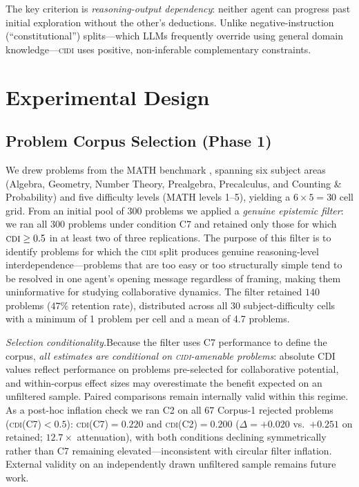 \documentclass{article}
\newcommand{\CDI}{\textsc{cdi}}
\newcommand{\CIDI}{\textsc{cidi}}
\begin{document}
The key criterion is \emph{reasoning-output dependency}: neither agent
can progress past initial exploration without the other's deductions.
Unlike negative-instruction (``constitutional'') splits---which LLMs
frequently override using general domain knowledge---\CIDI{} uses
positive, non-inferable complementary constraints.

\section{Experimental Design}
\label{sec:design}

\subsection{Problem Corpus Selection (Phase 1)}

We drew problems from the MATH benchmark \citep{hendrycks2021math},
spanning six subject areas (Algebra, Geometry, Number Theory,
Prealgebra, Precalculus, and Counting \& Probability) and five
difficulty levels (MATH levels 1--5), yielding a $6 \times 5 = 30$
cell grid. From an initial pool of 300 problems we applied a
\emph{genuine epistemic filter}: we ran all 300 problems under
condition C7 and retained only those for which $\CDI \geq 0.5$ in at
least two of three replications. The purpose of this filter is to
identify problems for which the \CIDI{} split produces genuine
reasoning-level interdependence---problems that are too easy or too
structurally simple tend to be resolved in one agent's opening message
regardless of framing, making them uninformative for studying
collaborative dynamics. The filter retained $140$ problems
($47\%$ retention rate), distributed across all 30 subject-difficulty
cells with a minimum of 1 problem per cell and a mean of 4.7 problems.

\emph{Selection conditionality.}\enspace Because the filter uses C7
performance to define the corpus, \emph{all estimates are conditional on
\CIDI-amenable problems}: absolute CDI values reflect performance on
problems pre-selected for collaborative potential, and within-corpus
effect sizes may overestimate the benefit expected on an unfiltered sample.
Paired comparisons remain internally valid within this regime.
As a post-hoc inflation check we ran C2 on all $67$ Corpus-1 rejected problems
(\CDI(C7)${}<0.5$): \CDI(C7)${}=0.220$ and \CDI(C2)${}=0.200$
($\Delta=+0.020$ vs.\ $+0.251$ on retained; $12.7\times$ attenuation),
with both conditions declining symmetrically rather than C7 remaining elevated---inconsistent with circular filter inflation. External validity on an independently drawn unfiltered sample remains future work.
\end{document}
